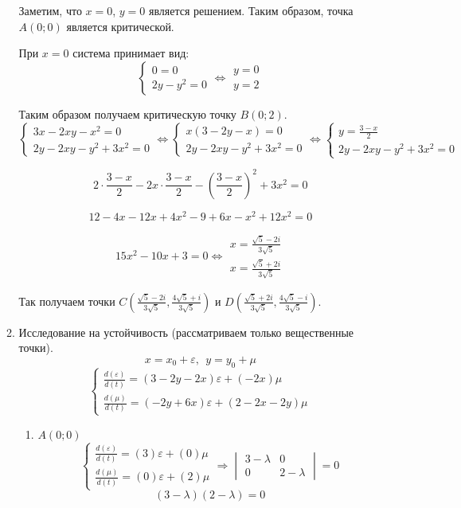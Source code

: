 \documentclass[11pt]{article}
\begin{document}
\begin{enumerate}
\begin{enumerate}
			Заметим, что $x = 0$,  $y = 0$ является решением. Таким образом, точка $A(0;0)$ является критической. 
			
			При $x = 0$ система принимает вид:
			$$
			\begin{cases}
				0 = 0 \\
				2y - y^2  = 0
			\end{cases}
			\Leftrightarrow
			\begin{gathered}
				y = 0 \\
				y = 2 
			\end{gathered}
			$$ 
			
			Таким образом получаем критическую точку $B(0;2)$. 
			$$
			\begin{cases}
				3x-2xy-x^2 = 0 \\
				2y - 2xy - y^2 + 3x^2 = 0
			\end{cases}
			\Leftrightarrow
			\begin{cases}
				x(3-2y-x) = 0 \\
				2y - 2xy - y^2 + 3x^2 = 0
			\end{cases}
			\Leftrightarrow
			\begin{cases}
				y = \frac{3-x}{2} \\
				2y - 2xy - y^2 + 3x^2 = 0
			\end{cases}
			$$ 
			
			$$
			2\cdot\frac{3-x}{2} - 2x\cdot\frac{3-x}{2} - \left(\frac{3-x}{2}\right)^2 + 3x^2 = 0
			$$ 
			
			$$
			12-4x -12x+4x^2 - 9+6x-x^2 + 12x^2 = 0
			$$ 
			
			$$
			15x^2-10x+3=0 \Leftrightarrow
			\begin{gathered}
				x = \frac{\sqrt{5}-2i}{3\sqrt{5}} \\
				x = \frac{\sqrt{5}+2i}{3\sqrt{5}} 
			\end{gathered}
			$$ 
			
			Так получаем точки $C(\frac{\sqrt{5}-2i}{3\sqrt{5}}, \frac{4\sqrt{5}+i}{3\sqrt{5}})$ и $D(\frac{\sqrt{5}+2i}{3\sqrt{5}} , \frac{4\sqrt{5}-i}{3\sqrt{5}})$. 
			
			\item
			Исследование на устойчивость (рассматриваем только вещественные точки). $$ x = x_0 + \varepsilon, \:\: y = y_0 + \mu$$
			$$\begin{cases}
				\frac{d(\varepsilon)}{d(t)} = (3-2y-2x)\varepsilon+(-2x)\mu\\
				\frac{d(\mu)}{d(t)} = (-2y+6x)\varepsilon+(2-2x-2y)\mu 
			\end{cases}$$
			\begin{enumerate}
				\item $A(0;0)$
				$$\begin{cases}
					\frac{d(\varepsilon)}{d(t)} = (3)\varepsilon+(0)\mu\\
					\frac{d(\mu)}{d(t)} = (0)\varepsilon+(2)\mu 
				\end{cases}\Rightarrow \begin{vmatrix}
				3-\lambda & 0\\
				0 & 2 - \lambda
			\end{vmatrix} = 0$$
				$$ (3-\lambda)(2-\lambda) = 0$$
		

\end{enumerate}
\end{enumerate}
\end{enumerate}
\end{document}
